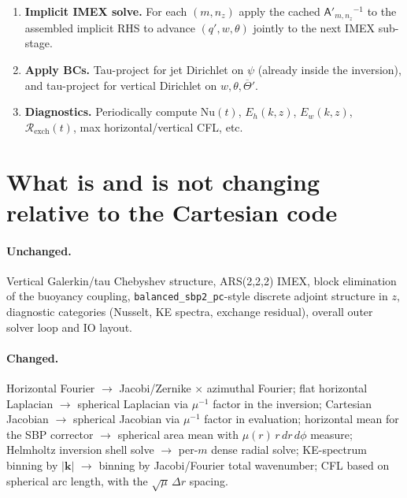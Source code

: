 \documentclass[11pt]{article}
\newcommand{\Jsphere}{\mathsf{J}_{\mathbb{S}}}
\begin{document}
\begin{enumerate}[leftmargin=2em,itemsep=3pt]
  add Jacobian contributions, planetary-stretching contributions
  (from $\Jsphere(\psi, f)$), and mean-exchange contributions.
  \item \textbf{Implicit IMEX solve.}  For each $(m, n_{z})$ apply
  the cached $\mathsf{A}'_{m,n_{z}}{}^{-1}$ to the assembled implicit
  RHS to advance $(q', w, \theta)$ jointly to the next IMEX
  sub-stage.
  \item \textbf{Apply BCs.}  Tau-project for jet Dirichlet on $\psi$
  (already inside the inversion), and tau-project for vertical
  Dirichlet on $w, \theta, \overline{\Theta}'$.
  \item \textbf{Diagnostics.}  Periodically compute
  $\mathrm{Nu}(t)$, $E_{h}(k,z)$, $E_{w}(k,z)$,
  $\mathcal{R}_{\mathrm{exch}}(t)$, max horizontal/vertical CFL,
  etc.
\end{enumerate}

\section{What is and is not changing relative to the Cartesian code}

\paragraph{Unchanged.}  Vertical Galerkin/tau Chebyshev structure,
ARS(2,2,2) IMEX, block elimination of the buoyancy coupling,
\verb|balanced_sbp2_pc|-style discrete adjoint structure in $z$,
diagnostic categories (Nusselt, KE spectra, exchange residual),
overall outer solver loop and IO layout.

\paragraph{Changed.}  Horizontal Fourier $\to$ Jacobi/Zernike $\times$
azimuthal Fourier; flat horizontal Laplacian $\to$ spherical
Laplacian via $\mu^{-1}$ factor in the inversion; Cartesian Jacobian
$\to$ spherical Jacobian via $\mu^{-1}$ factor in evaluation;
horizontal mean for the SBP corrector $\to$ spherical area mean with
$\mu(r)\,r\,dr\,d\phi$ measure; Helmholtz inversion shell solve
$\to$ per-$m$ dense radial solve; KE-spectrum binning by $|\bm{k}|$
$\to$ binning by Jacobi/Fourier total wavenumber; CFL based on
spherical arc length, with the $\sqrt{\mu}\,\Delta r$ spacing.
\end{document}
